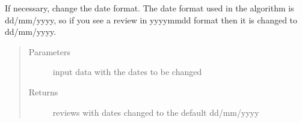 \documentclass[letterpaper,10pt,english]{sphinxmanual}
\begin{document}

\begin{fulllineitems}
\label{\detokenize{algorithms:algorithms.eti.eti_utils.change_the_date_format}}
\sphinxAtStartPar
If necessary, change the date format. The date format used in the algorithm is dd/mm/yyyy, so if you see a review
in yyyy\sphinxhyphen{}mm\sphinxhyphen{}dd format then it is changed to dd/mm/yyyy.
\begin{quote}\begin{description}
\item[{Parameters}] \leavevmode
\sphinxAtStartPar
{} \textendash{} input data with the dates to be changed

\item[{Returns}] \leavevmode
\sphinxAtStartPar
reviews with dates changed to the default dd/mm/yyyy

\end{description}\end{quote}

\end{fulllineitems}

\end{document}
